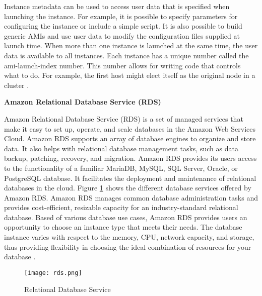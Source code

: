 \par Instance metadata can be used to access user data that is specified when launching the instance. For example, it
is possible to specify parameters for configuring the instance or include a simple script. It is also possible to
build generic AMIs and use user data to modify the configuration files supplied at launch time.
When more than one instance is launched at the same time, the user data is available to all instances. Each instance has a unique number called the ami-launch-index number. This number allows for writing code that controls what to do. For example, the first host might elect itself as the original node in a cluster \cite{33}.

\textbf{Amazon Relational Database Service (RDS)}

\par Amazon Relational Database Service (RDS) is a set of managed services that make it easy to set up, operate, and scale databases in the Amazon Web Services Cloud.
Amazon RDS supports an array of database engines to organize and store data.
It also helps with relational database management tasks,
such as data backup, patching, recovery, and migration.
Amazon RDS provides its users access to the functionality of a familiar MariaDB, MySQL, SQL Server, Oracle, or PostgreSQL database.
It facilitates the deployment and maintenance of relational databases in the cloud.
Figure \ref{fig:rds} shows the different database
services offered by Amazon RDS. Amazon RDS manages common database administration tasks and provides cost-efficient, resizable capacity for an industry-standard relational database.
Based of various database use cases, Amazon RDS provides users an opportunity to choose an instance type that meets their needs.
The database instance varies with respect to the memory, CPU, network capacity, and storage, thus providing flexibility in choosing the ideal combination of resources for your database \cite{34}.
\begin{figure}
    \centering
    \texttt{[image: rds.png]}
    \caption{Relational Database Service}
    \label{fig:rds}
\end{figure}

